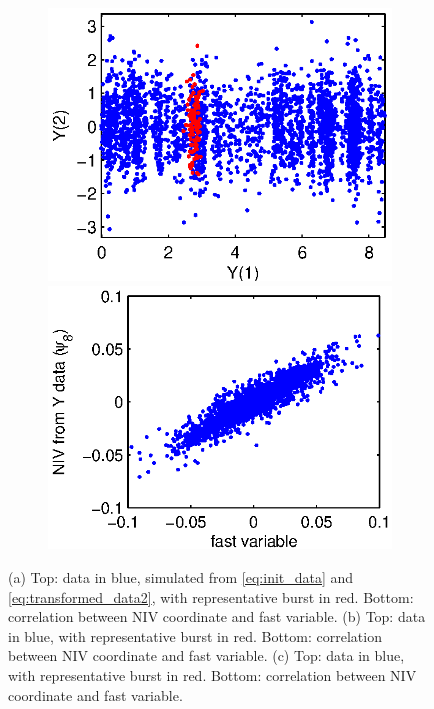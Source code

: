 \documentclass[1p]{elsarticle}
\begin{document}
\begin{figure}[h]
\begin{subfigure}{0.3\textwidth}
\includegraphics[width=\textwidth]{data_withburst_3}
\includegraphics[width=\textwidth]{fast_var_corr_3}
\caption{}
\end{subfigure}
\caption{
(a) Top: data in blue, simulated from \eqref{eq:init_data} and \eqref{eq:transformed_data2}, with representative burst in red.  
%
Bottom: correlation between NIV coordinate and fast variable. 
%
(b) Top: data in blue, with representative burst in red.  
%
Bottom: correlation between NIV coordinate and fast variable. 
%
(c) Top: data in blue, with representative burst in red.  
%
Bottom: correlation between NIV coordinate and fast variable. }
\label{fig:vary_burst}
\end{figure}
\end{document}
